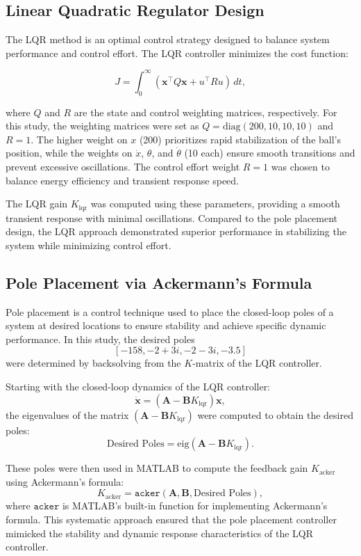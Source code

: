 \documentclass[conference]{IEEEtran}
\begin{document}
\subsection{Linear Quadratic Regulator Design}
\label{subsec:lqr_design}
The LQR method is an optimal control strategy designed to balance system performance and control effort. The LQR controller minimizes the cost function:

\begin{equation}
    J = \int_{0}^{\infty} (\mathbf{x}^\top Q \mathbf{x} + u^\top R u) \, dt,
\end{equation}

where \(Q\) and \(R\) are the state and control weighting matrices, respectively. For this study, the weighting matrices were set as \( Q = \text{diag}(200, 10, 10, 10) \) and \( R = 1 \). The higher weight on \(x\) (200) prioritizes rapid stabilization of the ball's position, while the weights on \(\dot{x}\), \(\theta\), and \(\dot{\theta}\) (10 each) ensure smooth transitions and prevent excessive oscillations. The control effort weight \(R = 1\) was chosen to balance energy efficiency and transient response speed.

The LQR gain \(K_{\text{lqr}}\) was computed using these parameters, providing a smooth transient response with minimal oscillations. Compared to the pole placement design, the LQR approach demonstrated superior performance in stabilizing the system while minimizing control effort.

\subsection{Pole Placement via Ackermann's Formula}
\label{subsec:control_pp_v_acker}
Pole placement is a control technique used to place the closed-loop poles of a system at desired locations to ensure stability and achieve specific dynamic performance. In this study, the desired poles 
\[
[-158, -2+3i, -2-3i, -3.5]
\]
were determined by backsolving from the \(K\)-matrix of the LQR controller.

Starting with the closed-loop dynamics of the LQR controller:
\[
\dot{\mathbf{x}} = (\mathbf{A} - \mathbf{B} K_{\text{lqr}}) \mathbf{x},
\]
the eigenvalues of the matrix \((\mathbf{A} - \mathbf{B} K_{\text{lqr}})\) were computed to obtain the desired poles:
\[
\text{Desired Poles} = \text{eig}(\mathbf{A} - \mathbf{B} K_{\text{lqr}}).
\]

These poles were then used in MATLAB to compute the feedback gain \(K_{\text{acker}}\) using Ackermann’s formula:
\[
K_{\text{acker}} = \texttt{acker}(\mathbf{A}, \mathbf{B}, \text{Desired Poles}),
\]
where \(\texttt{acker}\) is MATLAB's built-in function for implementing Ackermann’s formula. This systematic approach ensured that the pole placement controller mimicked the stability and dynamic response characteristics of the LQR controller.
\end{document}
